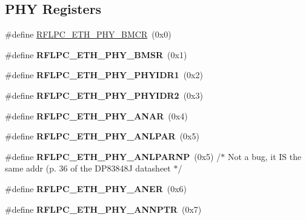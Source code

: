 \subsection*{P\-H\-Y Registers}
\begin{DoxyCompactItemize}
\item 
\#define \hyperlink{group__eth_ga86310a5e1a1c9ac6c50830a2c49bbc6a}{R\-F\-L\-P\-C\-\_\-\-E\-T\-H\-\_\-\-P\-H\-Y\-\_\-\-B\-M\-C\-R}~(0x0)
\item 
\hypertarget{group__eth_gac7f8f6487da92fc92615b0adef4a0304}{\#define {\bfseries R\-F\-L\-P\-C\-\_\-\-E\-T\-H\-\_\-\-P\-H\-Y\-\_\-\-B\-M\-S\-R}~(0x1)}\label{group__eth_gac7f8f6487da92fc92615b0adef4a0304}

\item 
\hypertarget{group__eth_ga2b83ec5ec2a6cc4d0c4e68eee70aeba1}{\#define {\bfseries R\-F\-L\-P\-C\-\_\-\-E\-T\-H\-\_\-\-P\-H\-Y\-\_\-\-P\-H\-Y\-I\-D\-R1}~(0x2)}\label{group__eth_ga2b83ec5ec2a6cc4d0c4e68eee70aeba1}

\item 
\hypertarget{group__eth_ga0fb67458742ba70486c2febc4f2a8d95}{\#define {\bfseries R\-F\-L\-P\-C\-\_\-\-E\-T\-H\-\_\-\-P\-H\-Y\-\_\-\-P\-H\-Y\-I\-D\-R2}~(0x3)}\label{group__eth_ga0fb67458742ba70486c2febc4f2a8d95}

\item 
\hypertarget{group__eth_ga698cc57cd212589b3976ab859e4cbf49}{\#define {\bfseries R\-F\-L\-P\-C\-\_\-\-E\-T\-H\-\_\-\-P\-H\-Y\-\_\-\-A\-N\-A\-R}~(0x4)}\label{group__eth_ga698cc57cd212589b3976ab859e4cbf49}

\item 
\hypertarget{group__eth_ga787185d27a236682b1c25222b66b1a0a}{\#define {\bfseries R\-F\-L\-P\-C\-\_\-\-E\-T\-H\-\_\-\-P\-H\-Y\-\_\-\-A\-N\-L\-P\-A\-R}~(0x5)}\label{group__eth_ga787185d27a236682b1c25222b66b1a0a}

\item 
\hypertarget{group__eth_ga50598967b789889bfba641ae247bbd5c}{\#define {\bfseries R\-F\-L\-P\-C\-\_\-\-E\-T\-H\-\_\-\-P\-H\-Y\-\_\-\-A\-N\-L\-P\-A\-R\-N\-P}~(0x5) /$\ast$ Not a bug, it I\-S the same addr (p. 36 of the D\-P83848\-J datasheet $\ast$/}\label{group__eth_ga50598967b789889bfba641ae247bbd5c}

\item 
\hypertarget{group__eth_gad2102936cd4aeaa7aa283547d4c3bdd9}{\#define {\bfseries R\-F\-L\-P\-C\-\_\-\-E\-T\-H\-\_\-\-P\-H\-Y\-\_\-\-A\-N\-E\-R}~(0x6)}\label{group__eth_gad2102936cd4aeaa7aa283547d4c3bdd9}

\item 
\hypertarget{group__eth_gabb2855db598e684cc9bbbfb7bbd67367}{\#define {\bfseries R\-F\-L\-P\-C\-\_\-\-E\-T\-H\-\_\-\-P\-H\-Y\-\_\-\-A\-N\-N\-P\-T\-R}~(0x7)}\label{group__eth_gabb2855db598e684cc9bbbfb7bbd67367}


\end{DoxyCompactItemize}
